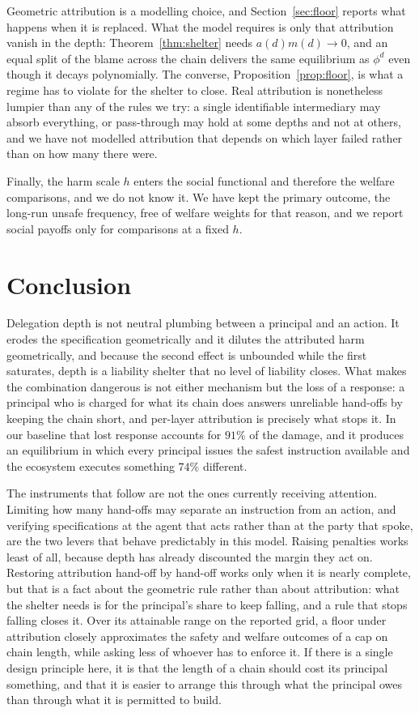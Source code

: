 \documentclass[11pt,a4paper]{article}
\theoremstyle{definition}
\begin{document}
Geometric attribution is a modelling choice, and Section~\ref{sec:floor}
reports what happens when it is replaced. What the model requires is only that
attribution vanish in the depth: Theorem~\ref{thm:shelter} needs
$a(d)m(d)\to 0$, and an equal split of the blame across the chain delivers the
same equilibrium as $\phi^{d}$ even though it decays polynomially. The
converse, Proposition~\ref{prop:floor}, is what a regime has to violate for the
shelter to close. Real attribution is nonetheless lumpier than any of the rules
we try: a single identifiable intermediary may absorb everything, or
pass-through may hold at some depths and not at others, and we have not modelled
attribution that depends on which layer failed rather than on how many there
were.

Finally, the harm scale $h$ enters the social functional and therefore the
welfare comparisons, and we do not know it. We have kept the primary outcome,
the long-run unsafe frequency, free of welfare weights for that reason, and we
report social payoffs only for comparisons at a fixed $h$.

\section{Conclusion}
\label{sec:conclusion}

Delegation depth is not neutral plumbing between a principal and an action. It
erodes the specification geometrically and it dilutes the attributed harm
geometrically, and because the second effect is unbounded while the first
saturates, depth is a liability shelter that no level of liability closes. What
makes the combination dangerous is not either mechanism but the loss of a
response: a principal who is charged for what its chain does answers unreliable
hand-offs by keeping the chain short, and per-layer attribution is precisely
what stops it. In our baseline that lost response accounts for $91\%$ of the
damage, and it produces an equilibrium in which every principal issues the
safest instruction available and the ecosystem executes something $74\%$
different.

The instruments that follow are not the ones currently receiving attention.
Limiting how many hand-offs may separate an instruction from an action, and
verifying specifications at the agent that acts rather than at the party that
spoke, are the two levers that behave predictably in this model. Raising
penalties works least of all, because depth has already discounted the margin
they act on. Restoring attribution hand-off by hand-off works only when it is
nearly complete, but that is a fact about the geometric rule rather than about
attribution: what the shelter needs is for the principal's share to keep
falling, and a rule that stops falling closes it. Over its attainable range on
the reported grid, a floor under attribution closely approximates the safety
and welfare outcomes of a cap on chain length, while asking less of whoever has
to enforce it. If there is a single design principle here, it is that the length of a
chain should cost its principal something, and that it is easier to arrange
this through what the principal owes than through what it is permitted to
build.
\end{document}
